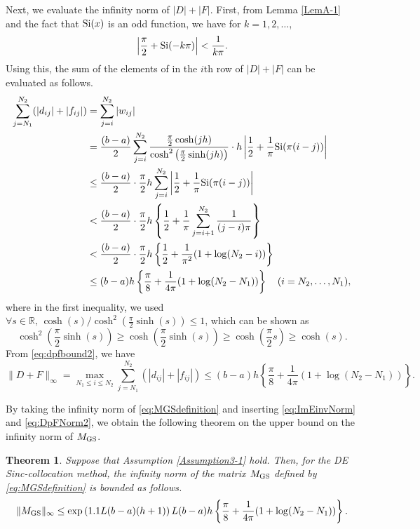 \documentclass[pdflatex,sn-mathphys-num]{sn-jnl}%
\newcommand{\q}{\quad}
\theoremstyle{thmstyleone}%
\newtheorem{theorem}{Theorem}%
\theoremstyle{thmstyletwo}%
\theoremstyle{thmstylethree}%
\begin{document}
Next, we evaluate the infinity norm of $|D|+|F|$. First, from Lemma \ref{LemA-1} and the fact that ${\rm Si}(x)$ is an odd function, we have for $k=1,2, \ldots$,
\begin{equation}
\left|\frac{\pi}{2}+{\rm Si}(-k\pi)\right|<\frac{1}{k\pi}.
\label{eq:Sideviation}
\end{equation}
Using this, the sum of the elements of in the $i$th row of $|D|+|F|$ can be evaluated as follows.
\begin{align}
\sum_{j=N_{1}}^{N_{2}} (|d_{ij}|+|f_{ij}|) &= \sum_{j=i}^{N_{2}} |w_{ij}| \nonumber \\
&= \frac{(b-a)}{2}\sum_{j=i}^{N_{2}} \frac{\frac{\pi}{2}\cosh(jh)}{\cosh^2\left(\frac{\pi}{2}\sinh(jh)\right)}\cdot h\left|\frac{1}{2}+\frac{1}{\pi}{\rm Si}(\pi(i-j))\right| \nonumber \\
&\le \frac{(b-a)}{2}\cdot\frac{\pi}{2}h\sum_{j=i}^{N_{2}} \left|\frac{1}{2}+\frac{1}{\pi}{\rm Si}(\pi(i-j))\right| \nonumber \\
&< \frac{(b-a)}{2}\cdot\frac{\pi}{2}h\left\{\frac{1}{2}+\frac{1}{\pi}\sum_{j=i+1}^{N_{2}} \frac{1}{(j-i)\pi}\right\} \nonumber \\
&< \frac{(b-a)}{2}\cdot\frac{\pi}{2}h\left\{\frac{1}{2}+\frac{1}{\pi^2}(1+\log(N_{2}-i))\right\} \nonumber \\
&\le (b-a)h\left\{\frac{\pi}{8}+\frac{1}{4\pi}(1+\log(N_{2} - N_{1}))\right\} \q (i=N_{2},\ldots,N_{1}),
\label{eq:dpfbound2}
\end{align}
where in the first inequality, we used $\forall s\in\mathbb{R},\, \cosh(s)/\cosh^2\left(\frac{\pi}{2}\sinh(s)\right) \le 1$, which can be shown as
\begin{equation}
\cosh^2\left(\frac{\pi}{2}\sinh(s)\right) \ge \cosh\left(\frac{\pi}{2}\sinh(s)\right) \ge \cosh\left(\frac{\pi}{2}s\right) \ge \cosh(s).
\end{equation}
From \eqref{eq:dpfbound2}, we have
\begin{equation}
\|D+F\|_{\infty}=\max_{N_{1} \le i\le N_{2}}\sum_{j=N_{1}}^{N_{2}}(|d_{ij}|+|f_{ij}|) \le (b-a)h\left\{\frac{\pi}{8}+\frac{1}{4\pi}(1+\log(N_{2} - N_{1}))\right\}.
\label{eq:DpFNorm2}
\end{equation}

By taking the infinity norm of \eqref{eq:MGSdefinition} and inserting \eqref{eq:ImEinvNorm} and \eqref{eq:DpFNorm2}, we obtain the following theorem on the upper bound on the infinity norm of $M_{\rm GS}$.
\begin{theorem}
\label{Th3-2}
Suppose that Assumption \ref{Assumption3-1} 
hold. Then, for the DE Sinc-collocation method, the infinity norm of the matrix $M_{\rm GS}$ defined by \eqref{eq:MGSdefinition} is bounded as follows.
\begin{equation}
\|M_{\rm GS}\|_{\infty} 
\le 
\exp \left(
1.1L(b-a) ( h  + 1 )
\right)
L(b-a)h \left\{\frac{\pi}{8}+\frac{1}{4\pi}(1+\log(N_{2} - N_{1}))\right\}.
\label{eq:MGSNorm2}
\end{equation}
\end{theorem}
\end{document}
